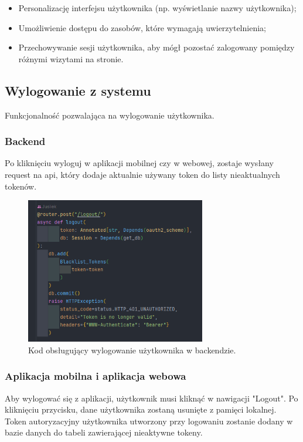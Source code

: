 \begin{itemize}
    \item Personalizację interfejsu użytkownika (np. wyświetlanie nazwy użytkownika);
    \item Umożliwienie dostępu do zasobów, które wymagają uwierzytelnienia;
    \item Przechowywanie sesji użytkownika, aby mógł pozostać zalogowany pomiędzy różnymi wizytami na stronie.
\end{itemize}

\subsection{Wylogowanie z systemu}
Funkcjonalność pozwalająca na wylogowanie użytkownika.

\subsubsection{Backend}
Po kliknięciu wyloguj w aplikacji mobilnej czy w webowej, zostaje wysłany request na api, który dodaje aktualnie używany token do listy nieaktualnych tokenów.

\begin{figure}[H]
    \centering
    \includegraphics[width=0.7\textwidth]{chapters/chapter_8/screens/wylogowanie_backend}
    \caption{Kod obsługujący wylogowanie użytkownika w backendzie.}
    \label{img:wylogowanie_backend}
\end{figure}

\subsubsection{Aplikacja mobilna i aplikacja webowa}
Aby wylogować się z aplikacji, użytkownik musi kliknąć w nawigacji "Logout". Po kliknięciu przycisku, dane użytkownika zostaną usunięte z pamięci lokalnej. Token autoryzacyjny użytkownika utworzony przy logowaniu zostanie dodany w bazie danych do tabeli zawierającej nieaktywne tokeny.

